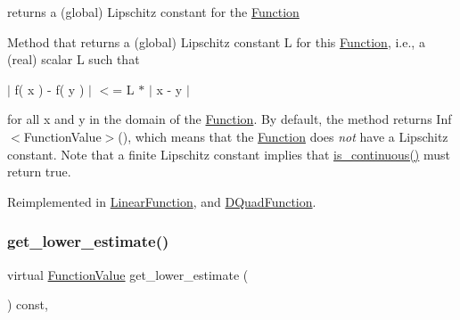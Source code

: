 returns a (global) Lipschitz constant for the \mbox{\hyperlink{class_s_m_spp__di__unipi__it_1_1_function}{Function}} 

Method that returns a (global) Lipschitz constant L for this \mbox{\hyperlink{class_s_m_spp__di__unipi__it_1_1_function}{Function}}, i.\+e., a (real) scalar L such that

$\vert$ f( x ) -\/ f( y ) $\vert$ $<$= L $\ast$ $\vert$ x -\/ y $\vert$

for all x and y in the domain of the \mbox{\hyperlink{class_s_m_spp__di__unipi__it_1_1_function}{Function}}. By default, the method returns Inf$<$\+Function\+Value$>$(), which means that the \mbox{\hyperlink{class_s_m_spp__di__unipi__it_1_1_function}{Function}} does {\itshape not} have a Lipschitz constant. Note that a finite Lipschitz constant implies that \mbox{\hyperlink{class_s_m_spp__di__unipi__it_1_1_function_a59de57710aa301d293e9126e3fb975bf}{is\+\_\+continuous()}} must return true. 

Reimplemented in \mbox{\hyperlink{class_s_m_spp__di__unipi__it_1_1_linear_function_a4f76a73bde6d436526ea03959f886105}{Linear\+Function}}, and \mbox{\hyperlink{class_s_m_spp__di__unipi__it_1_1_d_quad_function_a228a1eed4901ac03c7a51da94a9bc923}{D\+Quad\+Function}}.

\mbox{\label{class_s_m_spp__di__unipi__it_1_1_function_aa55bc7e19736e8d640ad31ec134b94fb}} 
\subsubsection{\texorpdfstring{get\+\_\+lower\+\_\+estimate()}{get\_lower\_estimate()}}
{\footnotesize\ttfamily virtual \mbox{\hyperlink{class_s_m_spp__di__unipi__it_1_1_function_a9ad432406b609e28d340f73e9474bffe}{Function\+Value}} get\+\_\+lower\+\_\+estimate (\begin{DoxyParamCaption}\item[{void}]{ }\end{DoxyParamCaption}) const\hspace{0.3cm}{\ttfamily [inline]}, {\ttfamily [virtual]}}



